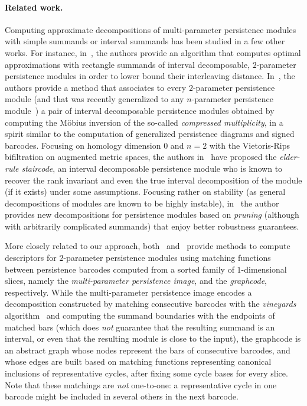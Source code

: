 \documentclass{article}
\begin{document}
\paragraph*{Related work.} 
Computing approximate decompositions of multi-parameter persistence modules
with simple summands or interval summands has been studied in a few other
works.
For instance, in~\cite{deyRectangularApproximationStability2021}, the authors
provide an algorithm that computes optimal approximations with rectangle
summands of interval decomposable, $2$-parameter persistence modules in order
to lower bound their interleaving distance.
In~\cite{asashibaApproximation2DPersistence2023}, the authors provide a method
that associates to every $2$-parameter persistence module (and that was
recently generalized to any $n$-parameter persistence
module~\cite{asashibaIntervalReplacementsPersistence2024}) a pair of interval
decomposable persistence modules obtained by computing the M\"obius inversion
of the so-called {\em compressed multiplicity}, in a spirit similar to the
computation of generalized persistence diagrams and signed barcodes. 
Focusing on homology dimension 0 and $n=2$ {with the Vietoris-Rips
bifiltration on augmented metric spaces}, the authors in~\cite{caiElderRuleStaircodesAugmentedMetric2021}
have proposed the {\em elder-rule staircode}, an interval decomposable
persistence module who is known to recover the rank invariant and even the true
interval decomposition of the module (if it exists) under some assumptions. 
Focusing rather on stability (as general decompositions of modules are known to
be highly instable),
in~\cite{bjerkevikStabilizingDecompositionMultiparameter2025} the author
provides new decompositions for persistence modules based on {\em pruning}
(although with arbitrarily complicated summands) that enjoy better robustness
guarantees.

More closely related to our approach,
both~\cite{carriereMultiparameterPersistenceImage2020}
and~\cite{russoldGraphcodeLearningMultiparameter2024,
kerberRepresentingTwoparameterPersistence2025} provide methods to compute
descriptors for $2$-parameter persistence modules using matching functions
between persistence barcodes computed from a sorted family of $1$-dimensional
slices, namely the {\em multi-parameter persistence image}, and the {\em
graphcode}, respectively.  
While the multi-parameter persistence image encodes a decomposition constructed
by matching consecutive barcodes with the {\em vineyards}
algorithm~\cite{cohen-steinerVinesVineyardsUpdating2006} and computing the
summand boundaries with the endpoints of matched bars (which does {\em not}
guarantee that the resulting summand is an interval, or even that the resulting
module is close to the input), the graphcode is an abstract graph whose nodes
represent the bars of consecutive barcodes, and whose edges are built based on
matching functions representing canonical inclusions of representative cycles,
after fixing some cycle bases for every slice. Note that these matchings are
{\em not} one-to-one: a representative cycle in one barcode might be included
in several others in the next barcode. 
\end{document}
